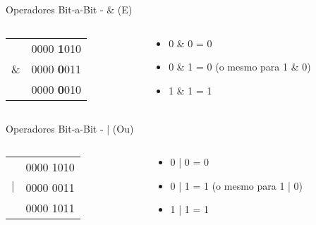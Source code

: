 \documentclass[t, aspectratio=169]{beamer}
\begin{document}
\begin{frame}[label={sec:org35849f4}]{Operadores Bit-a-Bit - \& (E)}
\begin{columns}
\begin{column}{0.5\columnwidth}
\begin{center}
\begin{tabular}{cc}
 & 0000 {\bfseries\color{highlight}1}010\\
\& & 0000 {\bfseries\color{highlight}0}011\\
\hline
 & 0000 {\bfseries\color{highlight}0}010\\
\end{tabular}
\end{center}
\end{column}

\begin{column}{0.5\columnwidth}
\begin{itemize}
\item 0 \& 0 = 0
\item \alert{\color{highlight}0 \& 1 = 0 (o mesmo para 1 \& 0)}
\item 1 \& 1 = 1
\end{itemize}
\end{column}
\end{columns}
\end{frame}

\begin{frame}[label={sec:orgeb824a2}]{Operadores Bit-a-Bit - | (Ou)}
\begin{columns}
\begin{column}{0.5\columnwidth}
\begin{center}
\begin{tabular}{cc}
 & 0000 1010\\
\(\mid\) & 0000 0011\\
\hline
 & 0000 1011\\
\end{tabular}
\end{center}
\end{column}

\begin{column}{0.5\columnwidth}
\begin{itemize}
\item 0 | 0 = 0
\item 0 | 1 = 1 (o mesmo para 1 | 0)
\item 1 | 1 = 1
\end{itemize}
\end{column}
\end{columns}
\end{frame}
\end{document}
